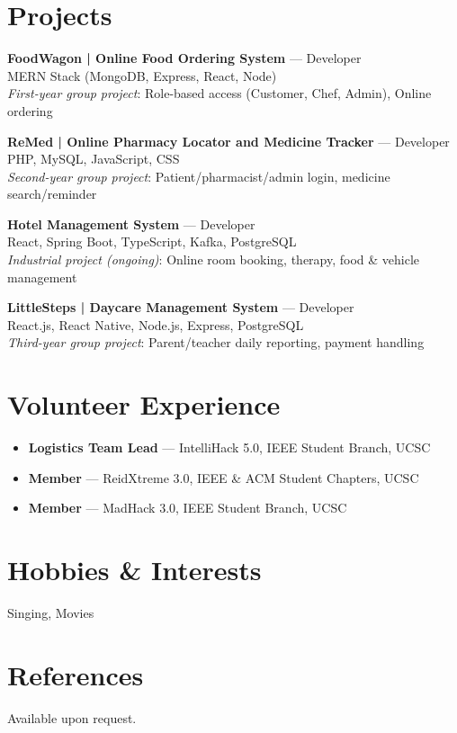 \documentclass[a4paper,10pt]{article}
\begin{document}
\section*{Projects}
\textbf{FoodWagon | Online Food Ordering System} — Developer \\
MERN Stack (MongoDB, Express, React, Node) \\
\textit{First-year group project}: Role-based access (Customer, Chef, Admin), Online ordering

\vspace{-1.5em}
\textbf{ReMed | Online Pharmacy Locator and Medicine Tracker} — Developer \\
PHP, MySQL, JavaScript, CSS \\
\textit{Second-year group project}: Patient/pharmacist/admin login, medicine search/reminder

\vspace{-1.5em}
\textbf{Hotel Management System} — Developer \\
React, Spring Boot, TypeScript, Kafka, PostgreSQL \\
\textit{Industrial project (ongoing)}: Online room booking, therapy, food & vehicle management

\vspace{-1.5em}
\textbf{LittleSteps | Daycare Management System} — Developer \\
React.js, React Native, Node.js, Express, PostgreSQL \\
\textit{Third-year group project}: Parent/teacher daily reporting, payment handling

\section*{Volunteer Experience}
\begin{itemize}[leftmargin=*]
    \item \textbf{Logistics Team Lead} — IntelliHack 5.0, IEEE Student Branch, UCSC
    \item \textbf{Member} — ReidXtreme 3.0, IEEE & ACM Student Chapters, UCSC
    \item \textbf{Member} — MadHack 3.0, IEEE Student Branch, UCSC
\end{itemize}

\section*{Hobbies \& Interests}
Singing, Movies

\section*{References}
Available upon request.
\end{document}
